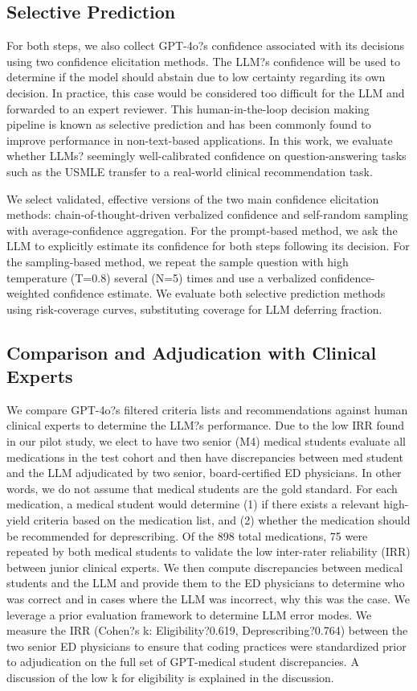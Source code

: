 \subsection{Selective Prediction}

For both steps, we also collect GPT-4o?s confidence associated with its decisions using two confidence elicitation methods. The LLM?s confidence will be used to determine if the model should abstain due to low certainty regarding its own decision. In practice, this case would be considered too difficult for the LLM and forwarded to an expert reviewer. This human-in-the-loop decision making pipeline is known as selective prediction and has been commonly found to improve performance in non-text-based applications. In this work, we evaluate whether LLMs? seemingly well-calibrated confidence on question-answering tasks such as the USMLE transfer to a real-world clinical recommendation task. 

We select validated, effective versions of the two main confidence elicitation methods: chain-of-thought-driven verbalized confidence and self-random sampling with average-confidence aggregation. For the prompt-based method, we ask the LLM to explicitly estimate its confidence for both steps following its decision. For the sampling-based method, we repeat the sample question with high temperature (T=0.8) several (N=5) times and use a verbalized confidence-weighted confidence estimate. We evaluate both selective prediction methods using risk-coverage curves, substituting coverage for LLM deferring fraction. 

\subsection{Comparison and Adjudication with Clinical Experts}

We compare GPT-4o?s filtered criteria lists and recommendations against human clinical experts to determine the LLM?s performance. Due to the low IRR found in our pilot study, we elect to have two senior (M4) medical students evaluate all medications in the test cohort and then have discrepancies between med student and the LLM adjudicated by two senior, board-certified ED physicians. In other words, we do not assume that medical students are the gold standard. For each medication, a medical student would  determine (1) if there exists a relevant high-yield criteria based on the medication list, and (2) whether the medication should be recommended for deprescribing. Of the 898 total medications, 75 were repeated by both medical students to validate the low inter-rater reliability (IRR) between junior clinical experts. We then compute discrepancies between medical students and the LLM and provide them to the ED physicians to determine who was correct and in cases where the LLM was incorrect, why this was the case. We leverage a prior evaluation framework to determine LLM error modes. We measure the IRR (Cohen?s k: Eligibility?0.619, Deprescribing?0.764) between the two senior ED physicians to ensure that coding practices were standardized prior to adjudication on the full set of GPT-medical student discrepancies. A discussion of the low k for eligibility is explained in the discussion. 


